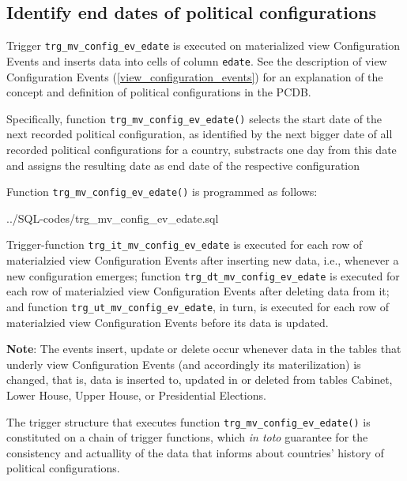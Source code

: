 \subsection{Identify end dates of political configurations}\label{trg_mv_config_ev_edate}
Trigger \texttt{\footnotesize trg\_mv\_config\_ev\_edate} is executed on materialized view Configuration Events and inserts data into cells of column \texttt{\footnotesize edate}. See the description of view Configuration Events (\ref{view_configuration_events}) for an explanation of the concept and definition of political configurations in the PCDB.

Specifically, function \texttt{\footnotesize trg\_mv\_config\_ev\_edate()} selects the start date of the next recorded political configuration, as identified by the next bigger date of all recorded political configurations for a country, substracts one day from this date and assigns the resulting date as end date of the respective configuration

Function \texttt{\footnotesize trg\_mv\_config\_ev\_edate()} is programmed as follows:

%
{../SQL-codes/trg_mv_config_ev_edate.sql}


Trigger-function \texttt{\footnotesize trg\_it\_mv\_config\_ev\_edate} is executed for each row of materialzied view Configuration Events after inserting new data, i.e., whenever a new configuration emerges; function  
\texttt{\footnotesize trg\_dt\_mv\_config\_ev\_edate} is executed for each row of materialzied view Configuration Events after deleting data from it; and 
function \texttt{\footnotesize trg\_ut\_mv\_config\_ev\_edate}, in turn, is executed for each row of materialzied view Configuration Events before its data is updated.  

{\bf Note}: The events insert, update or delete occur whenever data in the tables that underly view Configuration Events (and accordingly its materilization) is changed, that is, data is inserted to, updated in or deleted from tables Cabinet, Lower House, Upper House, or Presidential Elections. 

The trigger structure that executes function \texttt{\footnotesize trg\_mv\_config\_ev\_edate()} is constituted on a chain of trigger functions, which {\em in toto} guarantee for the consistency and actuallity of the data that informs about countries' history of political configurations.